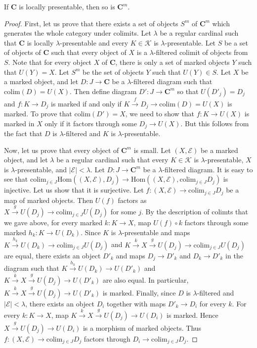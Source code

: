 \documentclass[reqno]{amsart}
\theoremstyle{definition}
\theoremstyle{remark}
\newcommand{\cat}[1]{\mathbf{#1}}
\newcommand{\C}{\cat{C}}
\newcommand{\Hom}{\mathrm{Hom}}
\newcommand{\colim}{\mathrm{colim}}
\numberwithin{figure}{section}
\begin{document}
\begin{prop}
If $\C$ is locally presentable, then so is $\C^m$.
\end{prop}
\begin{proof}
First, let us prove that there exists a set of objects $S^m$ of $\C^m$ which generates the whole category under colimits.
Let $\lambda$ be a regular cardinal such that $\C$ is locally $\lambda$-presentable and every $K \in \mathcal{K}$ is $\lambda$-presentable.
Let $S$ be a set of objects of $\C$ such that every object of $X$ is a $\lambda$-filtered colimit of objects from $S$.
Note that for every object $X$ of $\C$, there is only a set of marked objects $Y$ such that $U(Y) = X$.
Let $S^m$ be the set of objects $Y$ such that $U(Y) \in S$.
Let $X$ be a marked object, and let $D : J \to \C$ be a $\lambda$-filtered diagram such that $\colim(D) = U(X)$.
Then define diagram $D' : J \to \C^m$ so that $U(D'_j) = D_j$ and $f : K \to D_j$ is marked if and only if $K \xrightarrow{f} D_j \to \colim(D) = U(X)$ is marked.
To prove that $\colim(D') = X$, we need to show that $f : K \to U(X)$ is marked in $X$ only if it factors through some $D_j \to U(X)$.
But this follows from the fact that $D$ is $\lambda$-filtered and $K$ is $\lambda$-presentable.

Now, let us prove that every object of $\C^m$ is small.
Let $(X,\mathcal{E})$ be a marked object, and let $\lambda$ be a regular cardinal such that
every $K \in \mathcal{K}$ is $\lambda$-presentable, $X$ is $\lambda$-presentable, and $|\mathcal{E}| < \lambda$.
Let $D : J \to \C^m$ be a $\lambda$-filtered diagram.
It is easy to see that $\colim_{j \in J} \Hom((X,\mathcal{E}), D_j) \to \Hom((X,\mathcal{E}), \colim_{j \in J} D_j)$ is injective.
Let us show that it is surjective.
Let $f : (X,\mathcal{E}) \to \colim_{j \in J} D_j$ be a map of marked objects.
Then $U(f)$ factors as $X \xrightarrow{g} U(D_j) \to \colim_{j \in J} U(D_j)$ for some $j$.
By the description of colimts that we gave above, for every marked $k : K \to X$, map $U(f) \circ k$ factors through some marked $h_k : K \to U(D_k)$.
Since $K$ is $\lambda$-presentable and maps $K \xrightarrow{h_k} U(D_k) \to \colim_{j \in J} U(D_j)$
and $K \xrightarrow{k} X \xrightarrow{g} U(D_j) \to \colim_{j \in J} U(D_j)$ are equal,
there exists an object $D'_k$ and maps $D_j \to D'_k$ and $D_k \to D'_k$ in the diagram such that
$K \xrightarrow{h_k} U(D_k) \to U(D'_k)$ and $K \xrightarrow{k} X \xrightarrow{g} U(D_j) \to U(D'_k)$ are also equal.
In particular, $K \xrightarrow{k} X \xrightarrow{g} U(D_j) \to U(D'_k)$ is marked.
Finally, since $D$ is $\lambda$-filtered and $|\mathcal{E}| < \lambda$, there exists an object $D_i$ together with maps $D'_k \to D_i$ for every $k$.
For every $k : K \to X$, map $K \xrightarrow{k} X \xrightarrow{g} U(D_j) \to U(D_i)$ is marked.
Hence $X \xrightarrow{g} U(D_j) \to U(D_i)$ is a morphism of marked objects.
Thus $f : (X,\mathcal{E}) \to \colim_{j \in J} D_j$ factors through $D_i \to \colim_{j \in J} D_j$.
\end{proof}
\end{document}
